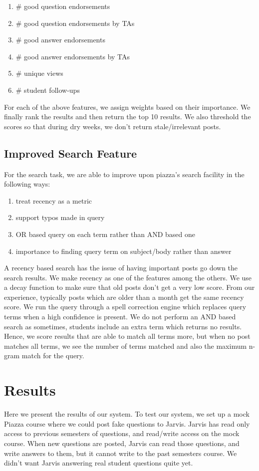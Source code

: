\documentclass[sigconf]{acmart}
\begin{document}
\begin{enumerate}
  \item \# good question endorsements
  \item \# good question endorsements by TAs
  \item \# good answer endorsements
  \item \# good answer endorsements by TAs
  \item \# unique views
  \item \# student follow-ups
\end{enumerate}

For each of the above features, we assign weights based on their importance. We finally rank the results and then return the top 10 results. We also threshold the scores so that during dry weeks, we don't return stale/irrelevant posts.

\subsection{Improved Search Feature}
For the search task, we are able to improve upon piazza's search facility in the following ways:
\begin{enumerate}
\item treat recency as a metric
\item support typos made in query
\item OR based query on each term rather than AND based one
\item importance to finding query term on subject/body rather than answer
\end{enumerate}

A recency based search has the issue of having important posts go down the search results. We make recency as one of the features among the others. We use a decay function to make sure that old posts don't get a very low score. From our experience, typically posts which are older than a month get the same recency score. We run the query through a spell correction engine which replaces query terms when a high confidence is present. We do not perform an AND based search as sometimes, students include an extra term which returns no results. Hence, we score results that are able to match all terms more, but when no post matches all terms, we see the number of terms matched and also the maximum n-gram match for the query. 

\section{Results}
Here we present the results of our system.
To test our system, we set up a mock Piazza course where we could post fake questions to Jarvis. Jarvis has read only access to previous semesters of questions, and read/write access on the mock course. When new questions are posted, Jarvis can read those questions, and write answers to them, but it cannot write to the past semesters course. We didn't want Jarvis answering real student questions quite yet.	
\end{document}
